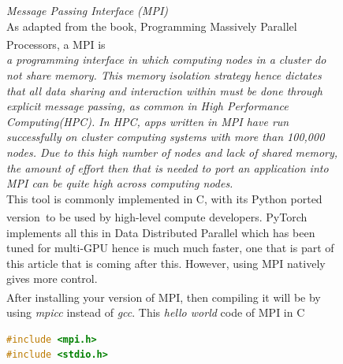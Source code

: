 \documentclass[12pt]{article}
\newcommand{\customtext}[3]{%
    \vspace{#2} %
    \fontsize{13}{8}\textcolor{#1}{\textit{#3}}%
}
\newcommand{\sidecite}[1]{\textsuperscript{\textcolor{blue}{\textbf{\scriptsize#1}}}}
\newcommand{\maincitecount}{\sidecite{\stepcounter{maincite}\themaincite}}
\begin{document}
\begin{figure}[!htb]
    \begin{minipage}[t]{0.65\textwidth}
    \raggedright
    \customtext{xtitle}{0em}{Message Passing Interface (MPI)}\\
    As adapted from the book, Programming Massively Parallel Processors\maincitecount, a MPI is\\
    \vspace{1em}
    {\it \small a programming interface in which computing nodes in a cluster do not share memory.
    This memory isolation strategy hence dictates that all data sharing and interaction within must 
    be done through explicit message passing, as common in High Performance Computing(HPC).
    In HPC, apps written in MPI have run successfully on cluster computing systems with 
    more than 100,000 nodes. Due to this high number of nodes and lack of shared memory, the 
    amount of effort then that is needed to port an application into MPI can be quite high 
    across computing nodes.}\\
    \vspace{1em}
    This tool is commonly implemented in C, with its Python ported version\maincitecount\ to be 
    used by high-level compute developers. PyTorch implements all this in Data Distributed Parallel 
    which has been tuned for multi-GPU hence is much much faster, one that is part of this article 
    that is coming after this. However, using MPI natively gives more control.\\
    After installing your version of MPI\maincitecount, then compiling it will be by using 
    {\it \color{xtitle}mpicc} instead of {\it \color{xtitle}gcc}. This {\it hello world} code of MPI
    in C
\begin{lstlisting}[language=c,style=c,basicstyle=\ttfamily\footnotesize]
#include <mpi.h>
#include <stdio.h>


\end{lstlisting}
\end{minipage}
\end{figure}
\end{document}
